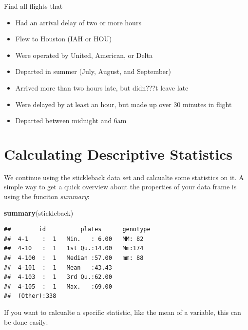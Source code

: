 \documentclass[]{article}
\newenvironment{Shaded}{\begin{snugshade}}{\end{snugshade}}
\newcommand{\KeywordTok}[1]{\textcolor[rgb]{0.13,0.29,0.53}{\textbf{#1}}}
\newcommand{\NormalTok}[1]{#1}
\newcommand{\OperatorTok}[1]{\textcolor[rgb]{0.81,0.36,0.00}{\textbf{#1}}}
\begin{document}
Find all flights that

\begin{itemize}
\item
  Had an arrival delay of two or more hours
\item
  Flew to Houston (IAH or HOU)
\item
  Were operated by United, American, or Delta
\item
  Departed in summer (July, August, and September)
\item
  Arrived more than two hours late, but didn???t leave late
\item
  Were delayed by at least an hour, but made up over 30 minutes in
  flight
\item
  Departed between midnight and 6am
\end{itemize}

\hypertarget{calculating-descriptive-statistics}{%
\section{Calculating Descriptive
Statistics}\label{calculating-descriptive-statistics}}

We continue using the stickleback data set and calcualte some statistics
on it. A simple way to get a quick overview about the properties of your
data frame is using the funciton \emph{summary}:

\begin{Shaded}
\begin{Highlighting}[]
\KeywordTok{summary}\NormalTok{(stickleback)}
\end{Highlighting}
\end{Shaded}

\begin{verbatim}
##        id          plates      genotype
##  4-1    :  1   Min.   : 6.00   MM: 82  
##  4-10   :  1   1st Qu.:14.00   Mm:174  
##  4-100  :  1   Median :57.00   mm: 88  
##  4-101  :  1   Mean   :43.43           
##  4-103  :  1   3rd Qu.:62.00           
##  4-105  :  1   Max.   :69.00           
##  (Other):338
\end{verbatim}

If you want to calcualte a specific statistic, like the mean of a
variable, this can be done easily:

\begin{Shaded}
\end{Shaded}
\end{document}
